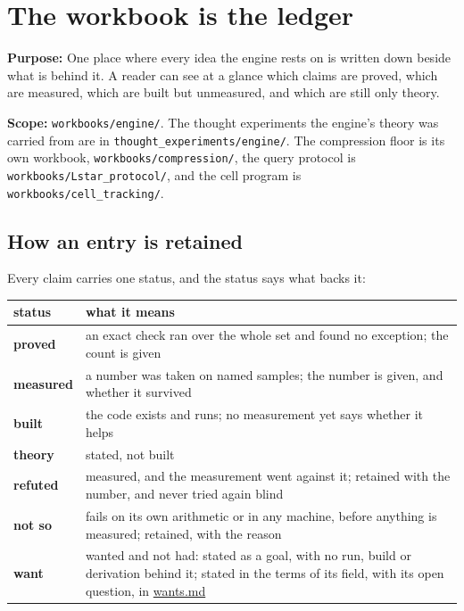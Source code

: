 \chapter{\texorpdfstring{The workbook is the ledger}{The workbook is the ledger}}
\label{chap:readme}

\textbf{Purpose:} One place where every idea the engine rests on is written down beside what is behind it. A reader can see at a glance which claims are proved, which are measured, which are built but unmeasured, and which are still only theory.

\textbf{Scope:} \texttt{workbooks/\allowbreak{}engine/\allowbreak{}}. The thought experiments the engine's theory was carried from are in \texttt{thought\_\allowbreak{}experiments/\allowbreak{}engine/\allowbreak{}}. The compression floor is its own workbook, \texttt{workbooks/\allowbreak{}compression/\allowbreak{}}, the query protocol is \texttt{workbooks/\allowbreak{}Lstar\_\allowbreak{}protocol/\allowbreak{}}, and the cell program is \texttt{workbooks/\allowbreak{}cell\_\allowbreak{}tracking/\allowbreak{}}.

\section{\texorpdfstring{How an entry is retained}{How an entry is retained}}

Every claim carries one status, and the status says what backs it:

{\small
\setlength{\tabcolsep}{6pt}
\begin{longtable}{>{\RaggedRight\arraybackslash}p{}>{\RaggedRight\arraybackslash}p{}}
\toprule
status & what it means \\
\midrule
\endhead
\textbf{proved} & an exact check ran over the whole set and found no exception; the count is given \\
\textbf{measured} & a number was taken on named samples; the number is given, and whether it survived \\
\textbf{built} & the code exists and runs; no measurement yet says whether it helps \\
\textbf{theory} & stated, not built \\
\textbf{refuted} & measured, and the measurement went against it; retained with the number, and never tried again blind \\
\textbf{not so} & fails on its own arithmetic or in any machine, before anything is measured; retained, with the reason \\
\textbf{want} & wanted and not had: stated as a goal, with no run, build or derivation behind it; stated in the terms of its field, with its open question, in \hyperref[chap:wants]{wants.md} \\
\bottomrule
\end{longtable}
}

